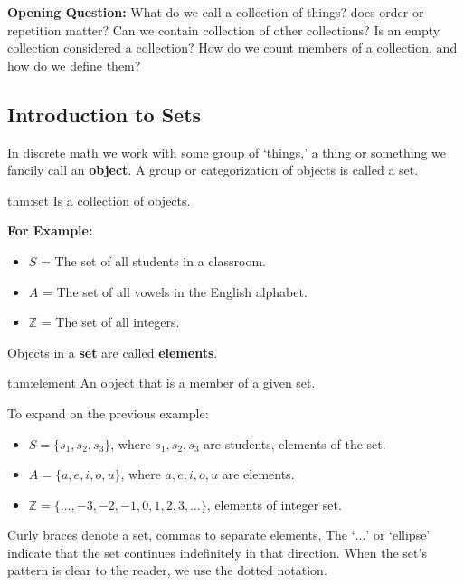 \textbf{Opening Question:} What do we call a collection of things?
does order or repetition matter? Can we contain collection of other collections? Is an empty collection
considered a collection? How do we count members of a collection, and how do we define them?\\

\subsection{Introduction to Sets}
\hspace*{1em}
In discrete math we work with some group of `things,' a thing or something
we fancily call an \textbf{object}. A group or categorization of objects is called a set.

\begin{theo}[Set]{thm:set}
    Is a collection of objects.
\end{theo}

\noindent
\textbf{For Example:}
\begin{itemize}
    \item $S$ = The set of all students in a classroom.
    \item $A$ = The set of all vowels in the English alphabet.
    \item $\mathbb{Z}$ = The set of all integers.

\end{itemize}
Objects in a \textbf{set} are called \textbf{elements}.

\begin{theo}[Element]{thm:element}
    An object that is a member of a given set.
\end{theo}

\noindent
To expand on the previous example:
\begin{itemize}
    \item $S = \{s_1, s_2, s_3\}$, where $s_1, s_2, s_3$ are students, elements of the set.
    \item $A = \{a, e, i, o, u\}$, where $a, e, i, o, u$ are elements.
    \item $\mathbb{Z} = \{\ldots, -3, -2, -1, 0, 1, 2, 3, \ldots\}$, elements of integer set.
\end{itemize}
Curly braces denote a set, commas to separate elements,
The `$...$' or `ellipse' indicate that the set continues indefinitely in that direction.
When the set's pattern is clear to the reader, we use the dotted notation.\\

